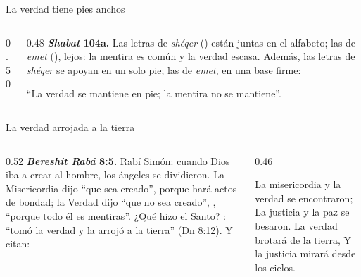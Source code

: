 \begin{frame}{La verdad tiene pies anchos}
\begin{columns}[c,onlytextwidth]
\begin{column}{0.50\textwidth}
\centering
{}
\end{column}
\begin{column}{0.48\textwidth}\small
\textbf{\emph{Shabat} 104a.} Las letras de \emph{shéqer} () están juntas en el alfabeto; las de \emph{emet} (), lejos: la mentira es común y la verdad escasa. Además, las letras de \emph{shéqer} se apoyan en un solo pie; las de \emph{emet}, en una base firme:
\begin{center}\end{center}
``La verdad se mantiene en pie; la mentira no se mantiene''.
\end{column}
\end{columns}\par\medskip
{}
\end{frame}

\begin{frame}{La verdad arrojada a la tierra}
\begin{columns}[t,onlytextwidth]
\begin{column}{0.52\textwidth}\small
\textbf{\emph{Bereshit Rabá} 8:5.} Rabí Simón: cuando Dios iba a crear al hombre, los ángeles se dividieron. La Misericordia dijo ``que sea creado'', porque hará actos de bondad; la Verdad dijo ``que no sea creado'', , ``porque todo él es mentiras''. ¿Qué hizo el Santo? : ``tomó la verdad y la arrojó a la tierra'' (Dn 8:12). Y citan:
\begin{center}\end{center}
\end{column}
\begin{column}{0.46\textwidth}
\begin{cita}La misericordia y la verdad se encontraron; La justicia y la paz se besaron. La verdad brotará de la tierra, Y la justicia mirará desde los cielos.\end{cita}
\end{column}
\end{columns}
\end{frame}

